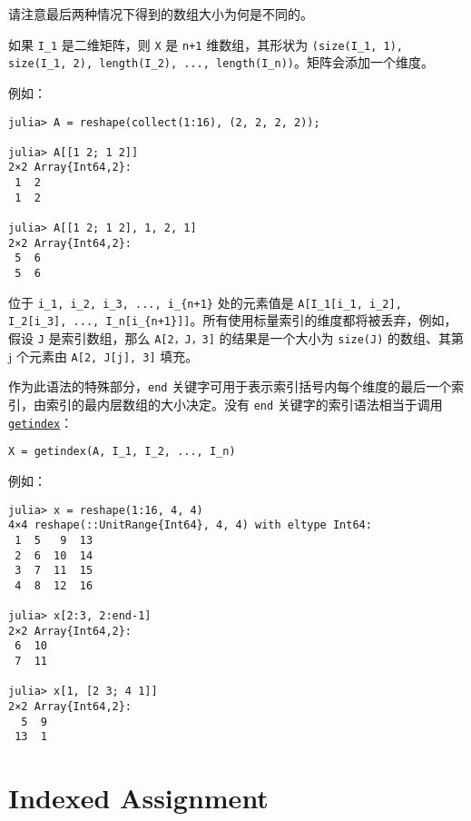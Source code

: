 请注意最后两种情况下得到的数组大小为何是不同的。



如果 \texttt{I\_1} 是二维矩阵，则 \texttt{X} 是 \texttt{n+1} 维数组，其形状为 \texttt{(size(I\_1, 1), size(I\_1, 2), length(I\_2), ..., length(I\_n))}。矩阵会添加一个维度。



例如：




\begin{verbatim}
julia> A = reshape(collect(1:16), (2, 2, 2, 2));

julia> A[[1 2; 1 2]]
2×2 Array{Int64,2}:
 1  2
 1  2

julia> A[[1 2; 1 2], 1, 2, 1]
2×2 Array{Int64,2}:
 5  6
 5  6
\end{verbatim}



位于 \texttt{i\_1, i\_2, i\_3, ..., i\_\{n+1\}} 处的元素值是 \texttt{A[I\_1[i\_1, i\_2], I\_2[i\_3], ..., I\_n[i\_\{n+1\}]]}。所有使用标量索引的维度都将被丢弃，例如，假设 \texttt{J} 是索引数组，那么 \texttt{A[2，J，3]} 的结果是一个大小为 \texttt{size(J)} 的数组、其第 j 个元素由 \texttt{A[2, J[j], 3]} 填充。



作为此语法的特殊部分，\texttt{end} 关键字可用于表示索引括号内每个维度的最后一个索引，由索引的最内层数组的大小决定。没有 \texttt{end} 关键字的索引语法相当于调用\hyperlink{13720608614876840481}{\texttt{getindex}}：




\begin{lstlisting}
X = getindex(A, I_1, I_2, ..., I_n)
\end{lstlisting}



例如：




\begin{verbatim}
julia> x = reshape(1:16, 4, 4)
4×4 reshape(::UnitRange{Int64}, 4, 4) with eltype Int64:
 1  5   9  13
 2  6  10  14
 3  7  11  15
 4  8  12  16

julia> x[2:3, 2:end-1]
2×2 Array{Int64,2}:
 6  10
 7  11

julia> x[1, [2 3; 4 1]]
2×2 Array{Int64,2}:
  5  9
 13  1
\end{verbatim}



\hypertarget{7105044708769418916}{}


\section{Indexed Assignment}



